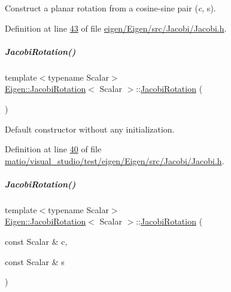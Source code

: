 Construct a planar rotation from a cosine-\/sine pair ({\itshape c}, {\ttfamily s}). 

Definition at line \hyperlink{eigen_2_eigen_2src_2_jacobi_2_jacobi_8h_source_l00043}{43} of file \hyperlink{eigen_2_eigen_2src_2_jacobi_2_jacobi_8h_source}{eigen/\+Eigen/src/\+Jacobi/\+Jacobi.\+h}.

\mbox{\label{group___jacobi___module_a38fec2c4da529ef3d05ff37b848b4227}} 
\subparagraph{\texorpdfstring{Jacobi\+Rotation()}{JacobiRotation()}\hspace{0.1cm}{\footnotesize\ttfamily [3/4]}}
{\footnotesize\ttfamily template$<$typename Scalar$>$ \\
\hyperlink{group___jacobi___module_class_eigen_1_1_jacobi_rotation}{Eigen\+::\+Jacobi\+Rotation}$<$ Scalar $>$\+::\hyperlink{group___jacobi___module_class_eigen_1_1_jacobi_rotation}{Jacobi\+Rotation} (\begin{DoxyParamCaption}{ }\end{DoxyParamCaption})\hspace{0.3cm}{\ttfamily [inline]}}

Default constructor without any initialization. 

Definition at line \hyperlink{matio_2visual__studio_2test_2eigen_2_eigen_2src_2_jacobi_2_jacobi_8h_source_l00040}{40} of file \hyperlink{matio_2visual__studio_2test_2eigen_2_eigen_2src_2_jacobi_2_jacobi_8h_source}{matio/visual\+\_\+studio/test/eigen/\+Eigen/src/\+Jacobi/\+Jacobi.\+h}.

\mbox{\label{group___jacobi___module_a3e8b5dc0a56f7a2d0f788b1ccb1547cb}} 
\subparagraph{\texorpdfstring{Jacobi\+Rotation()}{JacobiRotation()}\hspace{0.1cm}{\footnotesize\ttfamily [4/4]}}
{\footnotesize\ttfamily template$<$typename Scalar$>$ \\
\hyperlink{group___jacobi___module_class_eigen_1_1_jacobi_rotation}{Eigen\+::\+Jacobi\+Rotation}$<$ Scalar $>$\+::\hyperlink{group___jacobi___module_class_eigen_1_1_jacobi_rotation}{Jacobi\+Rotation} (\begin{DoxyParamCaption}\item[{const Scalar \&}]{c,  }\item[{const Scalar \&}]{s }\end{DoxyParamCaption})\hspace{0.3cm}{\ttfamily [inline]}}

